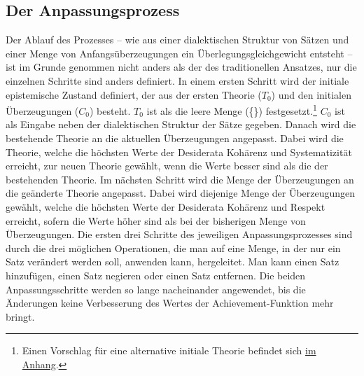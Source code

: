\documentclass{article}
\begin{document}
\subsection{Der Anpassungsprozess}
Der Ablauf des Prozesses -- wie aus einer dialektischen Struktur von Sätzen und einer Menge von Anfangsüberzeugungen ein Überlegungsgleichgewicht entsteht -- ist im Grunde genommen nicht anders als der des traditionellen Ansatzes, nur die einzelnen Schritte sind anders definiert. In einem ersten Schritt wird der initiale epistemische Zustand definiert, der aus der ersten Theorie ($T_0$) und den initialen Überzeugungen ($C_0$) besteht. $T_0$ ist als die leere Menge (\{\}) festgesetzt.\footnote{Einen Vorschlag für eine alternative initiale Theorie befindet sich \hyperref[better-first-theory]{im Anhang}.} $C_0$ ist als Eingabe neben der dialektischen Struktur der Sätze gegeben. Danach wird die bestehende Theorie an die aktuellen Überzeugungen angepasst. Dabei wird die Theorie, welche die höchsten Werte der Desiderata Kohärenz und Systematizität erreicht, zur neuen Theorie gewählt, wenn die Werte besser sind als die der bestehenden Theorie. Im nächsten Schritt wird die Menge der Überzeugungen an die geänderte Theorie angepasst. Dabei wird diejenige Menge der Überzeugungen gewählt, welche die höchsten Werte der Desiderata Kohärenz und Respekt erreicht, sofern die Werte höher sind als bei der bisherigen Menge von Überzeugungen. Die ersten drei Schritte des jeweiligen Anpassungsprozesses sind durch die drei möglichen Operationen, die man auf eine Menge, in der nur ein Satz verändert werden soll, anwenden kann, hergeleitet. Man kann einen Satz hinzufügen, einen Satz negieren oder einen Satz entfernen. Die beiden Anpassungsschritte werden so lange nacheinander angewendet, bis die Änderungen keine Verbesserung des Wertes der Achievement-Funktion mehr bringt. 
\end{document}
